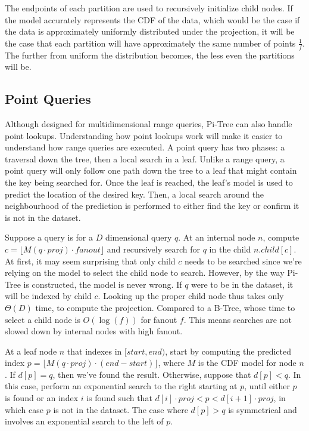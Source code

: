 \documentclass[sigconf,10pt]{acmart}
\begin{document}
The endpoints of each partition are used to recursively initialize child nodes.
If the model accurately represents the CDF of the data, which would be the case
if the data is approximately uniformly distributed under the projection,
it will be the case that each partition will have approximately the same number of
points $\frac{1}{f}$. The further from uniform the distribution becomes,
the less even the partitions will be.


\subsection{Point Queries}

Although designed for multidimensional range queries,
Pi-Tree can also handle point lookups. Understanding how point lookups
work will make it easier to understand how range queries are executed.
A point query has two phases: a traversal down the tree, then a local search
in a leaf.
Unlike a range query, a point query will only follow one path down the tree to
a leaf that might contain the key being searched for. Once the leaf is reached,
the leaf's model is used to predict the location of the desired key. 
Then, a local search around the neighbourhood of the prediction is performed
to either find the key or confirm it is not in the dataset.

Suppose a query is for a $D$ dimensional query $q$.
At an internal node $n$, compute $c = \lfloor M(q \cdot proj) \cdot fanout \rfloor$
and recursively search for $q$ in the child $n.child[c]$.
At first, it may seem surprising that only child $c$ needs to be searched
since we're relying on the model to select the child node to search.
However, by the way Pi-Tree is constructed, the model is never wrong.
If $q$ were to be in the dataset,
it will be indexed by child $c$. Looking up the proper child node thus takes only
$\Theta(D)$ time, to compute the projection. Compared to a B-Tree, whose
time to select a child node is $O(\log(f))$ for fanout $f$. This means
searches are not slowed down by internal nodes with high fanout.

At a leaf node $n$ that indexes in $[start, end)$, start by computing the predicted
index
$p = \lfloor M(q \cdot proj) \cdot (end - start) \rfloor$, where $M$ is the CDF model for node $n$.
If $d[p] = q$, then we've found the result.
Otherwise, suppose that $d[p] < q$.
In this case, perform an exponential search to the right starting at $p$,
until either $p$ is found or an index $i$ is found such that 
$d[i] \cdot proj < p < d[i+1] \cdot proj$, in which case $p$ is not in the dataset.
The case where $d[p] > q$ is symmetrical and involves an exponential search
to the left of $p$.
\end{document}
